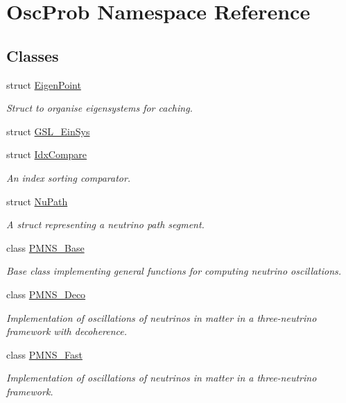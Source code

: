 \hypertarget{namespaceOscProb}{}\section{Osc\+Prob Namespace Reference}
\label{namespaceOscProb}
\subsection*{Classes}
\begin{DoxyCompactItemize}
\item 
struct \hyperlink{structOscProb_1_1EigenPoint}{Eigen\+Point}
\begin{DoxyCompactList}\small\item\em Struct to organise eigensystems for caching. \end{DoxyCompactList}\item 
struct \hyperlink{structOscProb_1_1GSL__EinSys}{G\+S\+L\+\_\+\+Ein\+Sys}
\item 
struct \hyperlink{structOscProb_1_1IdxCompare}{Idx\+Compare}
\begin{DoxyCompactList}\small\item\em An index sorting comparator. \end{DoxyCompactList}\item 
struct \hyperlink{structOscProb_1_1NuPath}{Nu\+Path}
\begin{DoxyCompactList}\small\item\em A struct representing a neutrino path segment. \end{DoxyCompactList}\item 
class \hyperlink{classOscProb_1_1PMNS__Base}{P\+M\+N\+S\+\_\+\+Base}
\begin{DoxyCompactList}\small\item\em Base class implementing general functions for computing neutrino oscillations. \end{DoxyCompactList}\item 
class \hyperlink{classOscProb_1_1PMNS__Deco}{P\+M\+N\+S\+\_\+\+Deco}
\begin{DoxyCompactList}\small\item\em Implementation of oscillations of neutrinos in matter in a three-\/neutrino framework with decoherence. \end{DoxyCompactList}\item 
class \hyperlink{classOscProb_1_1PMNS__Fast}{P\+M\+N\+S\+\_\+\+Fast}
\begin{DoxyCompactList}\small\item\em Implementation of oscillations of neutrinos in matter in a three-\/neutrino framework. \end{DoxyCompactList}\item 

\end{DoxyCompactItemize}
